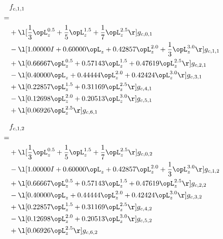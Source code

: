 \begin{alignat}{2} 
\label{eq:f_11_0} 
& f_{c,1,1} \nonumber \\ 
 = \\ 
& + \l[ \frac{1}{3} \opL_z^{0.5} + \frac{1}{5} \opL_z^{1.5} + \frac{1}{7} \opL_z^{2.5}  \r] g_{c,0,1} \nonumber \\ 
& - \l[  1.00000 I +  0.60000 \opL_z +  0.42857 \opL_z^{2.0} + \frac{1}{3} \opL_z^{3.0}  \r] g_{c,1,1} \nonumber \\ 
& + \l[  0.66667 \opL_z^{0.5} +  0.57143 \opL_z^{1.5} +  0.47619 \opL_z^{2.5}  \r] g_{c,2,1} \nonumber \\ 
& - \l[  0.40000 \opL_z +  0.44444 \opL_z^{2.0} +  0.42424 \opL_z^{3.0}  \r] g_{c,3,1} \nonumber \\ 
& + \l[  0.22857 \opL_z^{1.5} +  0.31169 \opL_z^{2.5}  \r] g_{c,4,1} \nonumber \\ 
& - \l[  0.12698 \opL_z^{2.0} +  0.20513 \opL_z^{3.0}  \r] g_{c,5,1} \nonumber \\ 
& + \l[  0.06926 \opL_z^{2.5}  \r] g_{c,6,1} \nonumber \\ 
\end{alignat} 


\begin{alignat}{2} 
\label{eq:f_12_0} 
& f_{c,1,2} \nonumber \\ 
 = \\ 
& + \l[ \frac{1}{3} \opL_z^{0.5} + \frac{1}{5} \opL_z^{1.5} + \frac{1}{7} \opL_z^{2.5}  \r] g_{c,0,2} \nonumber \\ 
& - \l[  1.00000 I +  0.60000 \opL_z +  0.42857 \opL_z^{2.0} + \frac{1}{3} \opL_z^{3.0}  \r] g_{c,1,2} \nonumber \\ 
& + \l[  0.66667 \opL_z^{0.5} +  0.57143 \opL_z^{1.5} +  0.47619 \opL_z^{2.5}  \r] g_{c,2,2} \nonumber \\ 
& - \l[  0.40000 \opL_z +  0.44444 \opL_z^{2.0} +  0.42424 \opL_z^{3.0}  \r] g_{c,3,2} \nonumber \\ 
& + \l[  0.22857 \opL_z^{1.5} +  0.31169 \opL_z^{2.5}  \r] g_{c,4,2} \nonumber \\ 
& - \l[  0.12698 \opL_z^{2.0} +  0.20513 \opL_z^{3.0}  \r] g_{c,5,2} \nonumber \\ 
& + \l[  0.06926 \opL_z^{2.5}  \r] g_{c,6,2} \nonumber \\ 
\end{alignat} 


